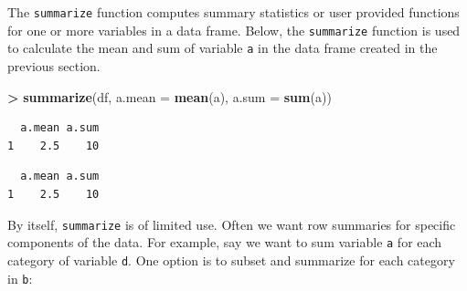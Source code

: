 \documentclass[]{krantz}
\makeatletter
\newenvironment{Shaded}{\begin{snugshade}}{\end{snugshade}}
\newcommand{\CommentTok}[1]{\textcolor[rgb]{0.37,0.37,0.37}{\textit{#1}}}
\newcommand{\DataTypeTok}[1]{\textcolor[rgb]{0.27,0.27,0.27}{#1}}
\newcommand{\ErrorTok}[1]{\textcolor[rgb]{0.14,0.14,0.14}{\textbf{#1}}}
\newcommand{\KeywordTok}[1]{\textcolor[rgb]{0.27,0.27,0.27}{\textbf{#1}}}
\newcommand{\NormalTok}[1]{#1}
\newcommand{\OperatorTok}[1]{\textcolor[rgb]{0.43,0.43,0.43}{\textbf{#1}}}
\newcommand{\StringTok}[1]{\textcolor[rgb]{0.5,0.5,0.5}{#1}}
\newenvironment{kframe}{%
\medskip{}
\setlength{\fboxsep}{.8em}
 \def\at@end@of@kframe{}%
 \ifinner\ifhmode%
  \def\at@end@of@kframe{\end{minipage}}%
  \begin{minipage}{\columnwidth}%
 \fi\fi%
 \def\FrameCommand##1{\hskip\@totalleftmargin \hskip-\fboxsep
 \colorbox{shadecolor}{##1}\hskip-\fboxsep
     \hskip-\linewidth \hskip-\@totalleftmargin \hskip\columnwidth}%
 \MakeFramed {\advance\hsize-\width
   \@totalleftmargin\z@ \linewidth\hsize
   \@setminipage}}%
 {\par\unskip\endMakeFramed%
 \at@end@of@kframe}
\renewenvironment{Shaded}{\begin{kframe}}{\end{kframe}}
\makeatother
\begin{document}
The \texttt{summarize} function computes summary statistics or user provided functions for one or more variables in a data frame. Below, the \texttt{summarize} function is used to calculate the mean and sum of variable \texttt{a} in the data frame created in the previous section.

\begin{Shaded}
\begin{Highlighting}[]
\OperatorTok{>}\StringTok{ }\KeywordTok{summarize}\NormalTok{(df, }\DataTypeTok{a.mean =} \KeywordTok{mean}\NormalTok{(a), }\DataTypeTok{a.sum =} \KeywordTok{sum}\NormalTok{(a))}
\end{Highlighting}
\end{Shaded}

\begin{verbatim}
  a.mean a.sum
1    2.5    10
\end{verbatim}

\begin{Shaded}
\end{Shaded}

\begin{verbatim}
  a.mean a.sum
1    2.5    10
\end{verbatim}

By itself, \texttt{summarize} is of limited use. Often we want row summaries for specific components of the data. For example, say we want to sum variable \texttt{a} for each category of variable \texttt{d}. One option is to subset and summarize for each category in \texttt{b}:

\begin{Shaded}
\end{Shaded}
\end{document}
